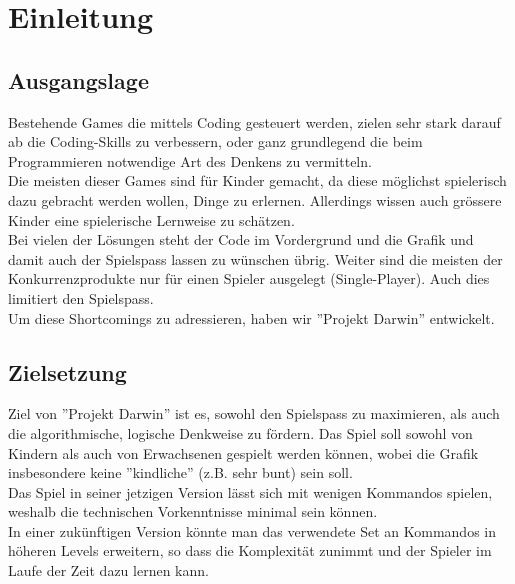 \documentclass[11pt,a4paper,titlepage]{article}
\begin{document}

\newpage

\section{Einleitung}
\subsection{Ausgangslage}


Bestehende Games die mittels Coding gesteuert werden, zielen sehr stark darauf ab die Coding-Skills zu verbessern, oder ganz grundlegend die beim Programmieren notwendige Art des Denkens zu vermitteln.\\
Die meisten dieser Games sind für Kinder gemacht, da diese möglichst spielerisch dazu gebracht werden wollen, Dinge zu erlernen. Allerdings wissen auch grössere Kinder eine spielerische Lernweise zu schätzen. \\
Bei vielen der Lösungen steht der Code im Vordergrund und die Grafik und damit auch der Spielspass lassen zu wünschen übrig. 
Weiter sind die meisten der Konkurrenzprodukte nur für einen Spieler ausgelegt (Single-Player). Auch dies limitiert den Spielspass.\\
Um diese Shortcomings zu adressieren, haben wir ''Projekt Darwin'' entwickelt.

\subsection{Zielsetzung}



Ziel von ''Projekt Darwin'' ist es, sowohl den Spielspass zu maximieren, als auch die algorithmische, logische Denkweise zu fördern. Das Spiel soll sowohl von Kindern als auch von Erwachsenen gespielt werden können, wobei die Grafik insbesondere keine ''kindliche'' (z.B. sehr bunt) sein soll.\\
Das Spiel in seiner jetzigen Version lässt sich mit wenigen Kommandos spielen, weshalb die technischen Vorkenntnisse minimal sein können.\\
In einer zukünftigen Version könnte man das verwendete Set an Kommandos in höheren Levels erweitern, so dass die Komplexität zunimmt und der Spieler im Laufe der Zeit dazu lernen kann.
\end{document}
